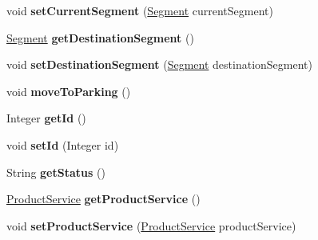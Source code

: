 \begin{DoxyCompactItemize}
void {\bfseries set\+Current\+Segment} (\mbox{\hyperlink{classmondragon_1_1edu_1_1clases_1_1_segment}{Segment}} current\+Segment)
\item 
\mbox{\label{classmondragon_1_1edu_1_1clases_1_1_vehicle_aebabed4d21b4e707ac60039f9969ede6}} 
\mbox{\hyperlink{classmondragon_1_1edu_1_1clases_1_1_segment}{Segment}} {\bfseries get\+Destination\+Segment} ()
\item 
\mbox{\label{classmondragon_1_1edu_1_1clases_1_1_vehicle_a3eeb0939be0511c6f147e156a02e275a}} 
void {\bfseries set\+Destination\+Segment} (\mbox{\hyperlink{classmondragon_1_1edu_1_1clases_1_1_segment}{Segment}} destination\+Segment)
\item 
\mbox{\label{classmondragon_1_1edu_1_1clases_1_1_vehicle_a51e0798935af0e2f750c4a757318b554}} 
void {\bfseries move\+To\+Parking} ()
\item 
\mbox{\label{classmondragon_1_1edu_1_1clases_1_1_vehicle_a8de80afe6e937057ceb2733a459edc03}} 
Integer {\bfseries get\+Id} ()
\item 
\mbox{\label{classmondragon_1_1edu_1_1clases_1_1_vehicle_ab58bbce3c27d3587b6cbbb5ef8475448}} 
void {\bfseries set\+Id} (Integer id)
\item 
\mbox{\label{classmondragon_1_1edu_1_1clases_1_1_vehicle_a6199bd54296bfc4726e7806ca9ebfaf3}} 
String {\bfseries get\+Status} ()
\item 
\mbox{\label{classmondragon_1_1edu_1_1clases_1_1_vehicle_ad3140e8753d9697bb50777e0359322c9}} 
\mbox{\hyperlink{interfacemondragon_1_1edu_1_1service_1_1_product_service}{Product\+Service}} {\bfseries get\+Product\+Service} ()
\item 
\mbox{\label{classmondragon_1_1edu_1_1clases_1_1_vehicle_ae869ae9f8aaf4b8422778d7f4a746d6b}} 
void {\bfseries set\+Product\+Service} (\mbox{\hyperlink{interfacemondragon_1_1edu_1_1service_1_1_product_service}{Product\+Service}} product\+Service)

\end{DoxyCompactItemize}
